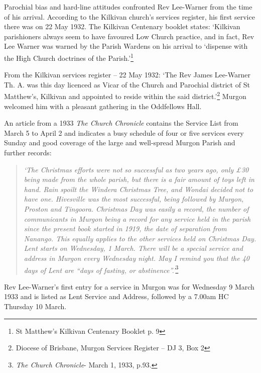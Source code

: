 Parochial bias and hard-line attitudes confronted Rev Lee-Warner from
the time of his arrival. According to the Kilkivan church's services
register, his first service there was on 22 May 1932. The Kilkivan
Centenary booklet states: `Kilkivan parishioners always seem to have
favoured Low Church practice, and in fact, Rev Lee Warner was warned by
the Parish Wardens on his arrival to `dispense with the High Church
doctrines of the Parish.'\footnote{St Matthew's Kilkivan Centenary
  Booklet p. 9}

From the Kilkivan services register -- 22 May 1932: `The Rev James
Lee-Warner Th. A. was this day licenced as Vicar of the Church and
Parochial district of St Matthew's, Kilkivan and appointed to reside
within the said district.'\footnote{Diocese of Brisbane, Murgon Services
  Register -- DJ 3, Box 2} Murgon welcomed him with a pleasant gathering
in the Oddfellows Hall.

An article from a 1933 \emph{The Church Chronicle} contains the Service
List from March 5 to April 2 and indicates a busy schedule of four or
five services every Sunday and good coverage of the large and
well-spread Murgon Parish and further records:

\begin{quote}
\emph{`The Christmas efforts were not so successful as two years ago,
only £30 being made from the whole parish, but there is a fair amount of
toys left in hand. Rain spoilt the Windera Christmas Tree, and Wondai
decided not to have one. Hivesville was the most successful, being
followed by Murgon, Proston and Tingoora. Christmas Day was easily a
record, the number of communicants in Murgon being a record for any
service held in the parish since the present book started in 1919, the
date of separation from Nanango. This equally applies to the other
services held on Christmas Day. Lent starts on Wednesday, 1 March. There
will be a special service and address in Murgon every Wednesday night.
May I remind you that the 40 days of Lent are ``days of fasting, or
abstinence''.'}\footnote{\emph{The Church Chronicle}- March 1, 1933,
  p.93.}
\end{quote}

Rev Lee-Warner's first entry for a service in Murgon was for Wednesday 9
March 1933 and is listed as Lent Service and Address\emph{,} followed by
a 7.00am HC Thursday 10 March.

